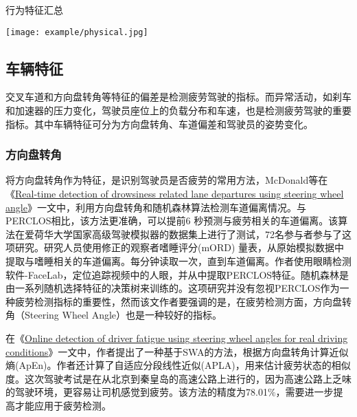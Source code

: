 \begin{table}[!htp]

\centering
\caption{行为特征汇总}
\texttt{[image: example/physical.jpg]}
\label{table:1-2}

\end{table}

\subsection{车辆特征}

交叉车道和方向盘转角等特征的偏差是检测疲劳驾驶的指标。而异常活动，如刹车和加速器的压力变化，驾驶员座位上的负载分布和车速，也是检测疲劳驾驶的重要指标。其中车辆特征可分为方向盘转角、车道偏差和驾驶员的姿势变化。

\subsubsection{方向盘转角}

将方向盘转角作为特征，是识别驾驶员是否疲劳的常用方法，McDonald等在
《\href{https://xueshu.baidu.com/usercenter/paper/show?paperid=3cf717214e2143abd5449c89f8cfd8d1&site=xueshu_se}{Real-time detection of drowsiness related lane departures using steering wheel angle}》一文中，利用方向盘转角和随机森林算法检测车道偏离情况。与PERCLOS相比，该方法更准确，可以提前6 秒预测与疲劳相关的车道偏离。该算法在爱荷华大学国家高级驾驶模拟器的数据集上进行了测试，72名参与者参与了这项研究。研究人员使用修正的观察者嗜睡评分(mORD) 量表，从原始模拟数据中提取与嗜睡相关的车道偏离。每分钟读取一次，直到车道偏离。作者使用眼睛检测软件-FaceLab，定位追踪视频中的人眼，并从中提取PERCLOS特征。随机森林是由一系列随机选择特征的决策树来训练的。这项研究并没有忽视PERCLOS作为一种疲劳检测指标的重要性，然而该文作者要强调的是，在疲劳检测方面，方向盘转角（Steering Wheel Angle）也是一种较好的指标。

在《\href{https://xueshu.baidu.com/usercenter/paper/show?paperid=520e8ddf646e97a09f78d361e1a76151&site=xueshu_se&hitarticle=1}{Online detection of driver fatigue using steering wheel angles for real driving conditions}》一文中，作者提出了一种基于SWA的方法，根据方向盘转角计算近似熵(ApEn)。作者还计算了自适应分段线性近似(APLA)，用来估计疲劳状态的相似度。这次驾驶考试是在从北京到秦皇岛的高速公路上进行的，因为高速公路上乏味的驾驶环境，更容易让司机感觉到疲劳。该方法的精度为78.01$\%$，需要进一步提高才能应用于疲劳检测。

